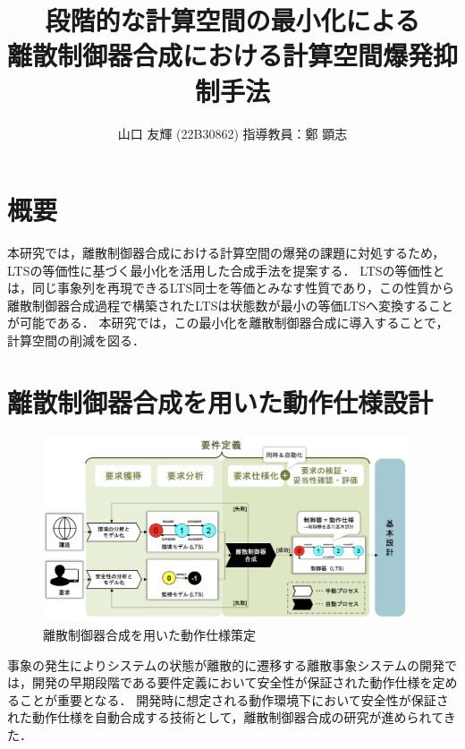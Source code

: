 \documentclass[11pt]{jarticle}
\begin{document}

\title{段階的な計算空間の最小化による\\離散制御器合成における計算空間爆発抑制手法}
\author{山口 友輝 (22B30862) \;\; 指導教員：鄭 顕志}
\date{\empty} %
\maketitle %
\thispagestyle{fancy}


\section{概要} 
本研究では，離散制御器合成における計算空間の爆発の課題に対処するため，LTSの等価性に基づく最小化を活用した合成手法を提案する．
LTSの等価性とは，同じ事象列を再現できるLTS同士を等価とみなす性質であり，この性質から離散制御器合成過程で構築されたLTSは状態数が最小の等価LTSへ変換することが可能である．
本研究では，この最小化を離散制御器合成に導入することで，計算空間の削減を図る．


\section{離散制御器合成を用いた動作仕様設計}

\begin{figure}
  \centering
  \includegraphics[width=10.8cm]{./figures/DCS.png}
  \caption{離散制御器合成を用いた動作仕様策定}
  \label{fig:1}
\end{figure}

事象の発生によりシステムの状態が離散的に遷移する離散事象システムの開発では，開発の早期段階である要件定義において安全性が保証された動作仕様を定めることが重要となる\cite{rebok}．
開発時に想定される動作環境下において安全性が保証された動作仕様を自動合成する技術として，離散制御器合成\cite{concurrency}の研究が進められてきた．
\end{document}
